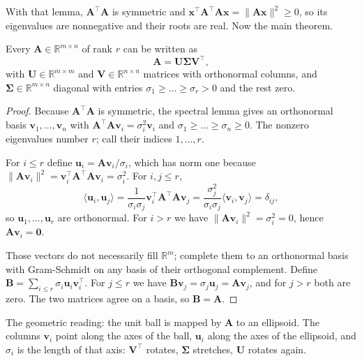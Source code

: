 With that lemma, $\mathbf{A}^{\top}\mathbf{A}$ is symmetric and
$\mathbf{x}^{\top}\mathbf{A}^{\top}\mathbf{A}\mathbf{x}=\|\mathbf{A}\mathbf{x}\|^{2}\ge0$,
so its eigenvalues are nonnegative and their roots are real. Now the main theorem.

\begin{teorema}
Every $\mathbf{A}\in\mathbb{R}^{m\times n}$ of rank $r$ can be written as
\[
  \mathbf{A}=\mathbf{U}\boldsymbol{\Sigma}\mathbf{V}^{\top},
\]
with $\mathbf{U}\in\mathbb{R}^{m\times m}$ and $\mathbf{V}\in\mathbb{R}^{n\times n}$
matrices with orthonormal columns, and $\boldsymbol{\Sigma}\in\mathbb{R}^{m\times n}$
diagonal with entries $\sigma_{1}\ge\dots\ge\sigma_{r}>0$ and the rest zero.
\end{teorema}

\begin{proof}
Because $\mathbf{A}^{\top}\mathbf{A}$ is symmetric, the spectral lemma gives an orthonormal basis
$\mathbf{v}_{1},\dots,\mathbf{v}_{n}$ with
$\mathbf{A}^{\top}\mathbf{A}\mathbf{v}_{i}=\sigma_{i}^{2}\mathbf{v}_{i}$ and
$\sigma_{1}\ge\dots\ge\sigma_{n}\ge0$. The nonzero eigenvalues number $r$;
call their indices $1,\dots,r$.

For $i\le r$ define $\mathbf{u}_{i}=\mathbf{A}\mathbf{v}_{i}/\sigma_{i}$, which
has norm one because $\|\mathbf{A}\mathbf{v}_{i}\|^{2}
=\mathbf{v}_{i}^{\top}\mathbf{A}^{\top}\mathbf{A}\mathbf{v}_{i}=\sigma_{i}^{2}$.
For $i,j\le r$,
\[
  \langle\mathbf{u}_{i},\mathbf{u}_{j}\rangle
  =\frac{1}{\sigma_{i}\sigma_{j}}\mathbf{v}_{i}^{\top}\mathbf{A}^{\top}\mathbf{A}\mathbf{v}_{j}
  =\frac{\sigma_{j}^{2}}{\sigma_{i}\sigma_{j}}\langle\mathbf{v}_{i},\mathbf{v}_{j}\rangle
  =\delta_{ij},
\]
so $\mathbf{u}_{1},\dots,\mathbf{u}_{r}$ are orthonormal. For $i>r$ we have
$\|\mathbf{A}\mathbf{v}_{i}\|^{2}=\sigma_{i}^{2}=0$, hence $\mathbf{A}\mathbf{v}_{i}=\mathbf{0}$.

Those vectors do not necessarily fill $\mathbb{R}^{m}$; complete them to an orthonormal basis with
Gram-Schmidt on any basis of their orthogonal complement. Define
$\mathbf{B}=\sum_{i\le r}\sigma_{i}\mathbf{u}_{i}\mathbf{v}_{i}^{\top}$. For $j\le r$
we have $\mathbf{B}\mathbf{v}_{j}=\sigma_{j}\mathbf{u}_{j}=\mathbf{A}\mathbf{v}_{j}$, and
for $j>r$ both are zero. The two matrices agree on a basis, so $\mathbf{B}=\mathbf{A}$.
\end{proof}

The geometric reading: the unit ball is mapped by $\mathbf{A}$ to an ellipsoid. The columns
$\mathbf{v}_{i}$ point along the axes of the ball, $\mathbf{u}_{i}$ along the axes of the ellipsoid, and $\sigma_{i}$
is the length of that axis: $\mathbf{V}^{\top}$ rotates, $\boldsymbol{\Sigma}$ stretches,
$\mathbf{U}$ rotates again.

